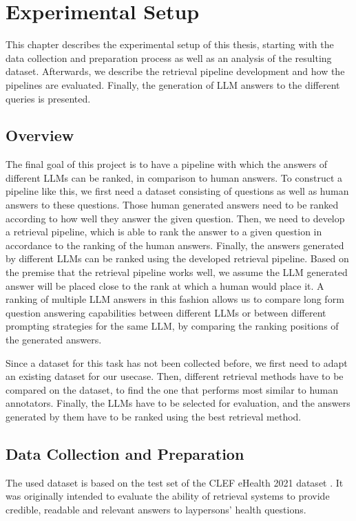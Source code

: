 \chapter{Experimental Setup}
This chapter describes the experimental setup of this thesis, starting with the data collection and preparation process as well as an analysis of the resulting dataset.
Afterwards, we describe the retrieval pipeline development and how the pipelines are evaluated.
Finally, the generation of LLM answers to the different queries is presented.

\section{Overview}\label{sec:overview}
The final goal of this project is to have a pipeline with which the answers of different LLMs can be ranked, in comparison to human answers.
To construct a pipeline like this, we first need a dataset consisting of questions as well as human answers to these questions.
Those human generated answers need to be ranked according to how well they answer the given question.
Then, we need to develop a retrieval pipeline, which is able to rank the answer to a given question in accordance to the ranking of the human answers.
Finally, the answers generated by different LLMs can be ranked using the developed retrieval pipeline.
Based on the premise that the retrieval pipeline works well, we assume the LLM generated answer will be placed close to the rank at which a human would place it.
A ranking of multiple LLM answers in this fashion allows us to compare long form question answering capabilities between different LLMs or between different prompting strategies for the same LLM, by comparing the ranking positions of the generated answers.

Since a dataset for this task has not been collected before, we first need to adapt an existing dataset for our usecase.
Then, different retrieval methods have to be compared on the dataset, to find the one that performs most similar to human annotators.
Finally, the LLMs have to be selected for evaluation, and the answers generated by them have to be ranked using the best retrieval method.

\section{Data Collection and Preparation}\label{sec:dataset}
The used dataset is based on the test set of the CLEF eHealth 2021 dataset \cite{goeuriot:2021:Consumer}.
It was originally intended to evaluate the ability of retrieval systems to provide credible, readable and relevant answers to laypersons' health questions.

